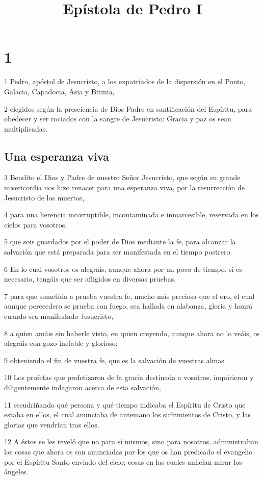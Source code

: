 
\title{Epístola de Pedro I}

\chapter{1}

\par 1 Pedro, apóstol de Jesucristo, a los expatriados de la dispersión en el Ponto, Galacia, Capadocia, Asia y Bitinia,
\par 2 elegidos según la presciencia de Dios Padre en santificación del Espíritu, para obedecer y ser rociados con la sangre de Jesucristo: Gracia y paz os sean multiplicadas.

\section*{Una esperanza viva}

\par 3 Bendito el Dios y Padre de nuestro Señor Jesucristo, que según su grande misericordia nos hizo renacer para una esperanza viva, por la resurrección de Jesucristo de los muertos,
\par 4 para una herencia incorruptible, incontaminada e inmarcesible, reservada en los cielos para vosotros,
\par 5 que sois guardados por el poder de Dios mediante la fe, para alcanzar la salvación que está preparada para ser manifestada en el tiempo postrero.
\par 6 En lo cual vosotros os alegráis, aunque ahora por un poco de tiempo, si es necesario, tengáis que ser afligidos en diversas pruebas,
\par 7 para que sometida a prueba vuestra fe, mucho más preciosa que el oro, el cual aunque perecedero se prueba con fuego, sea hallada en alabanza, gloria y honra cuando sea manifestado Jesucristo,
\par 8 a quien amáis sin haberle visto, en quien creyendo, aunque ahora no lo veáis, os alegráis con gozo inefable y glorioso;
\par 9 obteniendo el fin de vuestra fe, que es la salvación de vuestras almas.
\par 10 Los profetas que profetizaron de la gracia destinada a vosotros, inquirieron y diligentemente indagaron acerca de esta salvación,
\par 11 escudriñando qué persona y qué tiempo indicaba el Espíritu de Cristo que estaba en ellos, el cual anunciaba de antemano los sufrimientos de Cristo, y las glorias que vendrían tras ellos.
\par 12 A éstos se les reveló que no para sí mismos, sino para nosotros, administraban las cosas que ahora os son anunciadas por los que os han predicado el evangelio por el Espíritu Santo enviado del cielo; cosas en las cuales anhelan mirar los ángeles.

